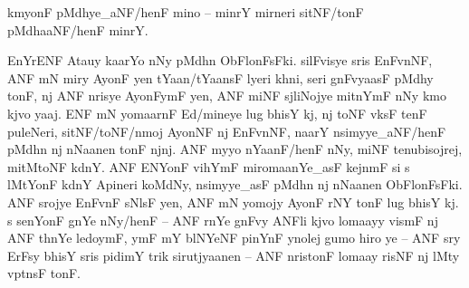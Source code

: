 \documentclass[12pt,varwidth=15.835cm,convert={density=300},border=5]{standalone}
\newenvironment{ayeri}{
	\hyphenpenalty=10000
    \doublespacing
    \Tagati
}{
    \par
}
\begin{document}

\begin{ayeri}
kmyonF pMdhye\_aNF/henF mino – minrY mirneri sitNF/tonF pMdhaaNF/henF minrY.

\hspace{0.25em} EnYrENF Atauy kaarYo nNy pMdhn ObFlonFsFki.
silF\-visye sris EnFvnNF, ANF mN miry AyonF yen tYaan/tYaansF lyeri khni, seri 
    gnFvyaasF pMdhy tonF, nj ANF nrisye AyonF\-ymF yen, ANF miNF sjliNojye 
    mitnYmF nNy kmo kjvo yaaj. ENF mN yomaarnF Ed/mineye lug bhisY kj, nj toNF 
	vksF tenF puleNeri, sitNF/toNF/nmoj AyonNF nj EnF\-vnNF, naarY 
    nsimyye\_aNF/henF pMdhn nj nNaanen tonF njnj. 
ANF myyo nYaanF/henF nNy, miNF tenubisojrej, mitMtoNF kdnY.
ANF ENYonF vihYmF miromaanYe\_asF kejnmF si s lMtYonF kdnY Apineri koMdNy, 
    nsimyye\_asF pMdhn nj nNaanen ObFlonFsFki.
ANF srojye EnFvnF sNlsF yen, ANF mN yomojy AyonF rNY tonF lug bhisY kj.
s senYonF gnYe nNy/henF – ANF rnYe gnF\-vy ANFli kjvo lomaayy vismF nj ANF 
    thnYe ledoymF, ymF mY blNYeNF pinYnF ynolej gumo hiro ye – ANF sry ErFsy
    bhisY sris pidimY trik sirutjyaanen – ANF nristonF lomaay risNF nj lMty
    vptnsF tonF.
\end{ayeri}

\end{document}
